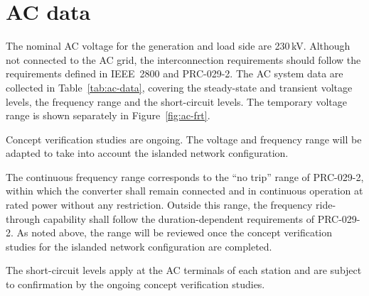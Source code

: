 \section{AC data}
\label{sec:ac-data}
The nominal AC voltage for the generation and load side are 230\,kV. Although not connected to the AC grid, the interconnection requirements should follow the requirements defined in IEEE~2800 and \mbox{PRC-029-2}.
The AC system data are collected in Table~\ref{tab:ac-data}, covering the
steady-state and transient voltage levels, the frequency range and the
short-circuit levels. The temporary voltage range is shown separately in
Figure~\ref{fig:ac-frt}.

Concept verification studies are ongoing. The voltage and frequency range will be adapted to take into account the islanded
network configuration.

The continuous frequency range corresponds to the ``no trip'' range of
\mbox{PRC-029-2}, within which the converter shall remain connected and in continuous
operation at rated power without any restriction. Outside this range, the
frequency ride-through capability shall follow the duration-dependent
requirements of \mbox{PRC-029-2}. As noted above, the range will be reviewed once the
concept verification studies for the islanded network configuration are
completed.

The short-circuit levels apply at the AC terminals of each station and are
subject to confirmation by the ongoing concept verification studies.

